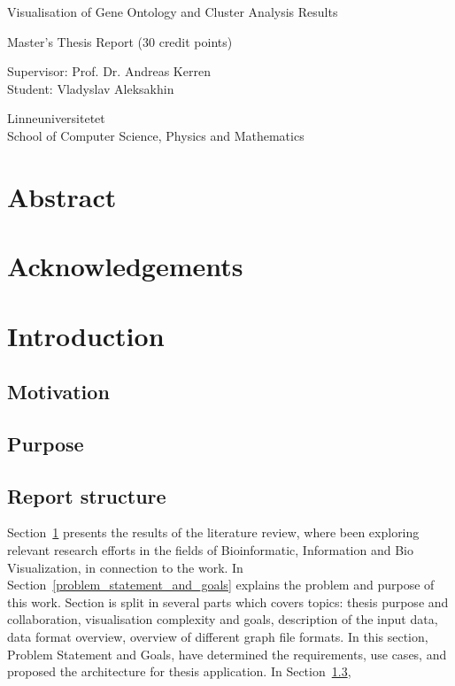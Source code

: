 \documentclass[a4paper,oneside]{article}
\begin{document}
\begin{titlepage}
\begin{center}

\Huge{Visualisation of Gene Ontology and Cluster Analysis Results}

\vfill

\begin{Large}
Master's Thesis Report (30 credit points)

\vfill

Supervisor: Prof. Dr. Andreas Kerren\\
Student: Vladyslav Aleksakhin

\vfill

Linneuniversitetet\\
School of Computer Science, Physics and Mathematics

\end{Large}


\end{center}
\end{titlepage}

\tableofcontents
\newpage

\section*{Abstract}

\newpage

\section*{Acknowledgements}

\section{Introduction}
\label{introduction}
\subsection{Motivation}

\subsection{Purpose}

\subsection{Report structure}
Section~\ref{introduction} presents the results of the literature review, where been exploring relevant research efforts in the fields of Bioinformatic, Information and Bio Visualization, in connection to the work. In Section~\ref{problem_statement_and_goals} explains the problem and purpose of this work. Section is split in several parts which covers topics: thesis purpose and collaboration, visualisation complexity and goals, description of the input data, data format overview, overview of different graph file formats. In this section, Problem Statement and Goals, have determined the requirements, use cases, and proposed the architecture for thesis application. In Section~\ref{}, 
\end{document}
